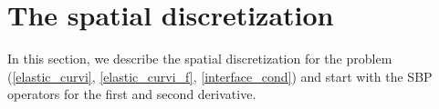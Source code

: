 \section{The spatial discretization}

In this section, we describe the spatial discretization for the problem (\ref{elastic_curvi}, \ref{elastic_curvi_f}, \ref{interface_cond}) and start with the SBP operators for the first and second derivative.

